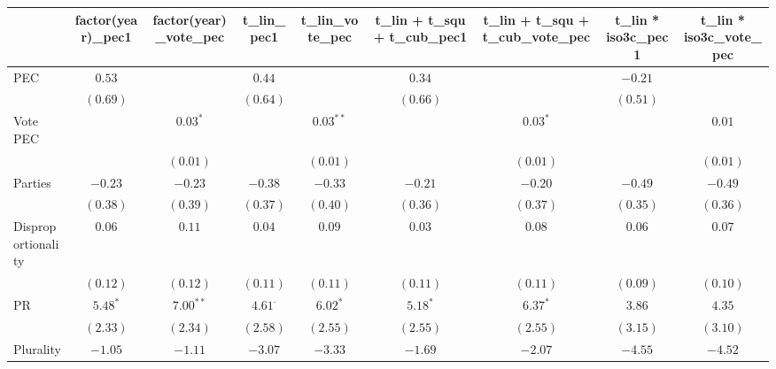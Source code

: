 
\usepackage{booktabs}

\begin{table}
\begin{center}
\begin{tabular}{l c c c c c c c c }
\toprule
 & factor(year)_pec1 & factor(year)_vote_pec & t_lin_pec1 & t_lin_vote_pec & t_lin + t_squ + t_cub_pec1 & t_lin + t_squ + t_cub_vote_pec & t_lin * iso3c_pec1 & t_lin * iso3c_vote_pec \\
\midrule
PEC                            & $0.53$       &               & $0.44$         &                & $0.34$         &                & $-0.21$         &                 \\
                               & $(0.69)$     &               & $(0.64)$       &                & $(0.66)$       &                & $(0.51)$        &                 \\
Vote PEC                       &              & $0.03^{*}$    &                & $0.03^{**}$    &                & $0.03^{*}$     &                 & $0.01$          \\
                               &              & $(0.01)$      &                & $(0.01)$       &                & $(0.01)$       &                 & $(0.01)$        \\
Parties                        & $-0.23$      & $-0.23$       & $-0.38$        & $-0.33$        & $-0.21$        & $-0.20$        & $-0.49$         & $-0.49$         \\
                               & $(0.38)$     & $(0.39)$      & $(0.37)$       & $(0.40)$       & $(0.36)$       & $(0.37)$       & $(0.35)$        & $(0.36)$        \\
Disproportionality             & $0.06$       & $0.11$        & $0.04$         & $0.09$         & $0.03$         & $0.08$         & $0.06$          & $0.07$          \\
                               & $(0.12)$     & $(0.12)$      & $(0.11)$       & $(0.11)$       & $(0.11)$       & $(0.11)$       & $(0.09)$        & $(0.10)$        \\
PR                             & $5.48^{*}$   & $7.00^{**}$   & $4.61^{\cdot}$ & $6.02^{*}$     & $5.18^{*}$     & $6.37^{*}$     & $3.86$          & $4.35$          \\
                               & $(2.33)$     & $(2.34)$      & $(2.58)$       & $(2.55)$       & $(2.55)$       & $(2.55)$       & $(3.15)$        & $(3.10)$        \\
Plurality                      & $-1.05$      & $-1.11$       & $-3.07$        & $-3.33$        & $-1.69$        & $-2.07$        & $-4.55$         & $-4.52$         \\

\end{tabular}
\end{center}
\end{table}
